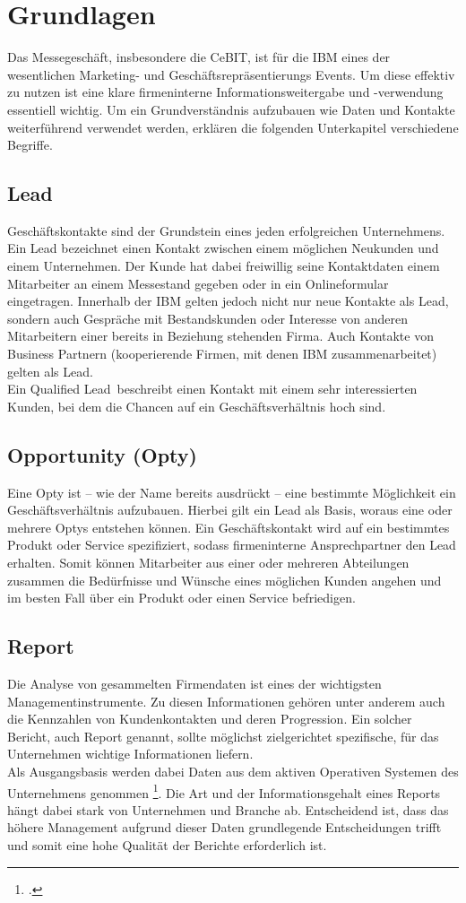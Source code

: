 \chapter{Grundlagen}
\label{cha:Grundlagen}
Das Messegeschäft, insbesondere die CeBIT, ist für die IBM eines der wesentlichen Marketing- und Geschäftsrepräsentierungs Events. Um diese effektiv zu nutzen ist eine klare firmeninterne Informationsweitergabe und -verwendung essentiell wichtig. Um ein Grundverständnis aufzubauen wie Daten und Kontakte weiterführend verwendet werden, erklären die folgenden Unterkapitel verschiedene Begriffe. 
\section{Lead}
Geschäftskontakte sind der Grundstein eines jeden erfolgreichen Unternehmens. Ein Lead bezeichnet einen Kontakt zwischen einem möglichen Neukunden und einem Unternehmen. Der Kunde hat dabei freiwillig seine Kontaktdaten \zb einem Mitarbeiter an einem Messestand gegeben oder in ein Onlineformular eingetragen. Innerhalb der IBM gelten jedoch nicht nur neue Kontakte als Lead, sondern auch Gespräche mit Bestandskunden oder Interesse von anderen Mitarbeitern einer bereits in Beziehung stehenden Firma. Auch Kontakte von Business Partnern (kooperierende Firmen, mit denen IBM zusammenarbeitet) gelten als Lead.\\
Ein \glqq Qualified Lead\grqq ~beschreibt einen Kontakt mit einem sehr interessierten Kunden, bei dem die Chancen auf ein Geschäftsverhältnis hoch sind.
\section{Opportunity (Opty)}
Eine Opty ist -- wie der Name bereits ausdrückt -- eine bestimmte Möglichkeit ein Geschäftsverhältnis aufzubauen. Hierbei gilt ein Lead als Basis, woraus eine oder mehrere Optys entstehen können. Ein Geschäftskontakt wird  auf ein bestimmtes Produkt oder Service spezifiziert, sodass firmeninterne Ansprechpartner den Lead erhalten. Somit können Mitarbeiter aus einer oder mehreren Abteilungen zusammen die Bedürfnisse und Wünsche eines möglichen Kunden angehen und im besten Fall über ein Produkt oder einen Service befriedigen.
\section{Report}
Die Analyse von gesammelten Firmendaten ist eines der wichtigsten Managementinstrumente. Zu diesen Informationen gehören unter anderem auch die Kennzahlen von Kundenkontakten und deren Progression. Ein solcher Bericht, auch Report genannt, sollte möglichst zielgerichtet spezifische, für das Unternehmen wichtige Informationen liefern.\\
Als Ausgangsbasis werden dabei Daten aus dem aktiven Operativen Systemen des Unternehmens genommen \footcite{rob}. Die Art und der Informationsgehalt eines Reports hängt dabei stark von Unternehmen und Branche ab. Entscheidend ist, dass das höhere Management aufgrund dieser Daten grundlegende Entscheidungen trifft und somit eine hohe Qualität der Berichte erforderlich ist.




\textbf{}

